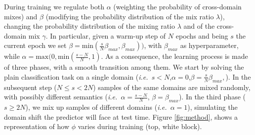 \documentclass[runningheads]{llncs}
\newcommand{\ie}{\emph{i.e.~}}
\begin{document}
During training we regulate both $\alpha$ (weighting the probability of cross-domain mixes) and $\beta$ (modifying the probability distribution of the mix ratio $\lambda$), changing the probability distribution of the mixing ratio $\lambda$ and of the cross-domain mix $\gamma$. In particular, given a warm-up step of $N$ epochs and being $s$ the current epoch we set $\beta=\text{min}(\frac{s}{N}\beta_{max},\beta_{max}))$, with $\beta_{max}$ as hyperparameter, while $\alpha=\text{max}(0,\text{min}(\frac{s-N}{N},1)$. As a consequence, the learning process is made of three phases, with a smooth transition among them. We start by solving the plain classification task on a single domain (\ie $s<N$,$\alpha=0$,$\beta=\frac{s}{N}\beta_{max},$). In the subsequent step ($N\leq s<2N$) samples of the same domains are mixed randomly, with possibly different semantics (\ie $\alpha=\frac{s-N}{N}$, $\beta=\beta_{max}$). In the third phase ($s\geq 2N$), we mix up samples of different domains (\ie $\alpha=1$), simulating the domain shift the predictor will face at test time. Figure \ref{fig:method}, shows a representation of how $\phi$ varies during training (top, white block).   
\end{document}
